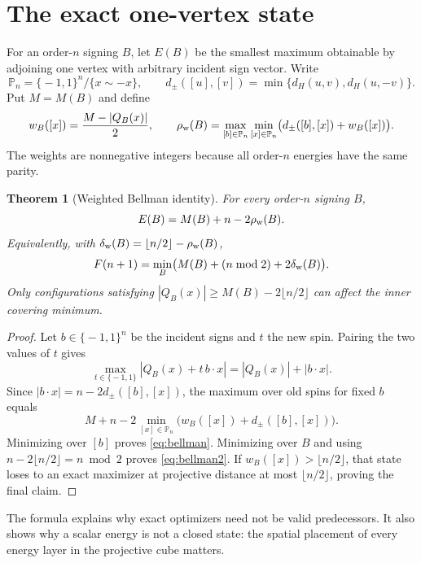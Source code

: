 \documentclass[11pt]{article}
\newcommand{\eps}{\{\!-1,1\!\}}
\newcommand{\PP}{\mathbb P}
\newtheorem{theorem}{Theorem}[section]
\theoremstyle{remark}
\begin{document}
\section{The exact one-vertex state}\label{sec:one-vertex}

For an order-$n$ signing $B$, let $E(B)$ be the smallest maximum obtainable
by adjoining one vertex with arbitrary incident sign vector.  Write
\[
 \PP_n=\eps^n/\{x\sim-x\},
 \qquad d_\pm([u],[v])=\min\{d_H(u,v),d_H(u,-v)\}.
\]
Put $M=M(B)$ and define
\[
 w_B([x])=\frac{M-|Q_B(x)|}{2},
 \qquad
 \rho_{\rm w}(B)=\max_{[b]\in\PP_n}\min_{[x]\in\PP_n}
 \bigl(d_\pm([b],[x])+w_B([x])\bigr).
\]
The weights are nonnegative integers because all order-$n$ energies have the
same parity.

\begin{theorem}[Weighted Bellman identity]
For every order-$n$ signing $B$,
\begin{equation}
 E(B)=M(B)+n-2\rho_{\rm w}(B).                            \label{eq:bellman}
\end{equation}
Equivalently, with
$\delta_{\rm w}(B)=\lfloor n/2\rfloor-\rho_{\rm w}(B)$,
\begin{equation}
 F(n+1)=\min_B\bigl(M(B)+(n\bmod2)+2\delta_{\rm w}(B)\bigr).
                                                               \label{eq:bellman2}
\end{equation}
Only configurations satisfying
$|Q_B(x)|\ge M(B)-2\lfloor n/2\rfloor$ can affect the inner covering
minimum.
\end{theorem}

\begin{proof}
Let $b\in\eps^n$ be the incident signs and $t$ the new spin.  Pairing the two
values of $t$ gives
\[
 \max_{t\in\eps}|Q_B(x)+t\,b\cdot x|
   =|Q_B(x)|+|b\cdot x|.
\]
Since $|b\cdot x|=n-2d_\pm([b],[x])$, the maximum over old spins for fixed
$b$ equals
\[
 M+n-2\min_{[x]\in\PP_n}
       \bigl(w_B([x])+d_\pm([b],[x])\bigr).
\]
Minimizing over $[b]$ proves \eqref{eq:bellman}.  Minimizing over $B$ and
using $n-2\lfloor n/2\rfloor=n\bmod2$ proves \eqref{eq:bellman2}.
If $w_B([x])>\lfloor n/2\rfloor$, that state loses to an exact maximizer at
projective distance at most $\lfloor n/2\rfloor$, proving the final claim.
\end{proof}

The formula explains why exact optimizers need not be valid predecessors.
It also shows why a scalar energy is not a closed state: the spatial
placement of every energy layer in the projective cube matters.
\end{document}
